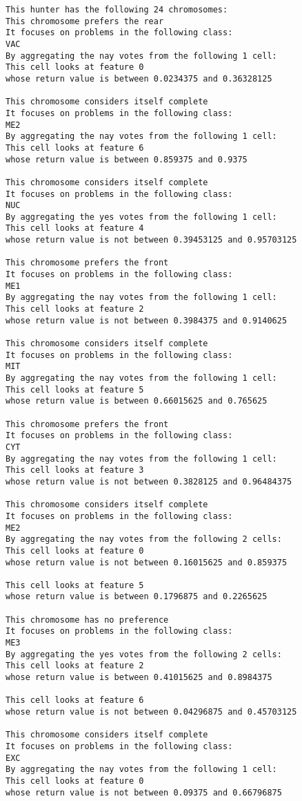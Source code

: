 \begin{lstlisting}[caption={Best Hunter, Yeast}]
This hunter has the following 24 chromosomes:
This chromosome prefers the rear
It focuses on problems in the following class:
VAC
By aggregating the nay votes from the following 1 cell:
This cell looks at feature 0
whose return value is between 0.0234375 and 0.36328125 

This chromosome considers itself complete
It focuses on problems in the following class:
ME2
By aggregating the nay votes from the following 1 cell:
This cell looks at feature 6
whose return value is between 0.859375 and 0.9375 

This chromosome considers itself complete
It focuses on problems in the following class:
NUC
By aggregating the yes votes from the following 1 cell:
This cell looks at feature 4
whose return value is not between 0.39453125 and 0.95703125 

This chromosome prefers the front
It focuses on problems in the following class:
ME1
By aggregating the nay votes from the following 1 cell:
This cell looks at feature 2
whose return value is not between 0.3984375 and 0.9140625 

This chromosome considers itself complete
It focuses on problems in the following class:
MIT
By aggregating the nay votes from the following 1 cell:
This cell looks at feature 5
whose return value is between 0.66015625 and 0.765625 

This chromosome prefers the front
It focuses on problems in the following class:
CYT
By aggregating the nay votes from the following 1 cell:
This cell looks at feature 3
whose return value is not between 0.3828125 and 0.96484375 

This chromosome considers itself complete
It focuses on problems in the following class:
ME2
By aggregating the nay votes from the following 2 cells:
This cell looks at feature 0
whose return value is not between 0.16015625 and 0.859375 

This cell looks at feature 5
whose return value is between 0.1796875 and 0.2265625 

This chromosome has no preference
It focuses on problems in the following class:
ME3
By aggregating the yes votes from the following 2 cells:
This cell looks at feature 2
whose return value is between 0.41015625 and 0.8984375 

This cell looks at feature 6
whose return value is not between 0.04296875 and 0.45703125 

This chromosome considers itself complete
It focuses on problems in the following class:
EXC
By aggregating the nay votes from the following 1 cell:
This cell looks at feature 0
whose return value is not between 0.09375 and 0.66796875 


\end{lstlisting}
